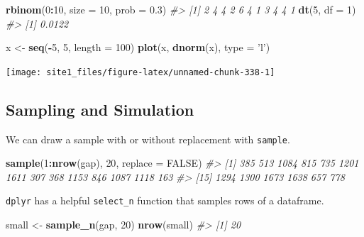 \documentclass[]{book}
\newenvironment{Shaded}{\begin{snugshade}}{\end{snugshade}}
\newcommand{\KeywordTok}[1]{\textcolor[rgb]{0.13,0.29,0.53}{\textbf{#1}}}
\newcommand{\DataTypeTok}[1]{\textcolor[rgb]{0.13,0.29,0.53}{#1}}
\newcommand{\DecValTok}[1]{\textcolor[rgb]{0.00,0.00,0.81}{#1}}
\newcommand{\FloatTok}[1]{\textcolor[rgb]{0.00,0.00,0.81}{#1}}
\newcommand{\StringTok}[1]{\textcolor[rgb]{0.31,0.60,0.02}{#1}}
\newcommand{\CommentTok}[1]{\textcolor[rgb]{0.56,0.35,0.01}{\textit{#1}}}
\newcommand{\OtherTok}[1]{\textcolor[rgb]{0.56,0.35,0.01}{#1}}
\newcommand{\OperatorTok}[1]{\textcolor[rgb]{0.81,0.36,0.00}{\textbf{#1}}}
\newcommand{\NormalTok}[1]{#1}
\begin{document}
\begin{Shaded}
\begin{Highlighting}[]
\KeywordTok{rbinom}\NormalTok{(}\DecValTok{0}\OperatorTok{:}\DecValTok{10}\NormalTok{, }\DataTypeTok{size =} \DecValTok{10}\NormalTok{, }\DataTypeTok{prob =} \FloatTok{0.3}\NormalTok{)}
\CommentTok{#>  [1] 2 4 4 2 6 4 1 3 4 4 1}
\KeywordTok{dt}\NormalTok{(}\DecValTok{5}\NormalTok{, }\DataTypeTok{df =} \DecValTok{1}\NormalTok{)}
\CommentTok{#> [1] 0.0122}

\NormalTok{x <-}\StringTok{ }\KeywordTok{seq}\NormalTok{(}\OperatorTok{-}\DecValTok{5}\NormalTok{, }\DecValTok{5}\NormalTok{, }\DataTypeTok{length =} \DecValTok{100}\NormalTok{)}
\KeywordTok{plot}\NormalTok{(x, }\KeywordTok{dnorm}\NormalTok{(x), }\DataTypeTok{type =} \StringTok{'l'}\NormalTok{)}
\end{Highlighting}
\end{Shaded}

\begin{center}\texttt{[image: site1\_files/figure-latex/unnamed-chunk-338-1]} \end{center}

\subsection{Sampling and Simulation}\label{sampling-and-simulation}

We can draw a sample with or without replacement with \texttt{sample}.

\begin{Shaded}
\begin{Highlighting}[]
\KeywordTok{sample}\NormalTok{(}\DecValTok{1}\OperatorTok{:}\KeywordTok{nrow}\NormalTok{(gap), }\DecValTok{20}\NormalTok{, }\DataTypeTok{replace =} \OtherTok{FALSE}\NormalTok{)}
\CommentTok{#>  [1]  385  513 1084  815  735 1201 1611  307  368 1153  846 1087 1118  163}
\CommentTok{#> [15] 1294 1300 1673 1638  657  778}
\end{Highlighting}
\end{Shaded}

\texttt{dplyr} has a helpful \texttt{select\_n} function that samples
rows of a dataframe.

\begin{Shaded}
\begin{Highlighting}[]
\NormalTok{small <-}\StringTok{ }\KeywordTok{sample_n}\NormalTok{(gap, }\DecValTok{20}\NormalTok{)}
\KeywordTok{nrow}\NormalTok{(small)}
\CommentTok{#> [1] 20}
\end{Highlighting}
\end{Shaded}
\end{document}
